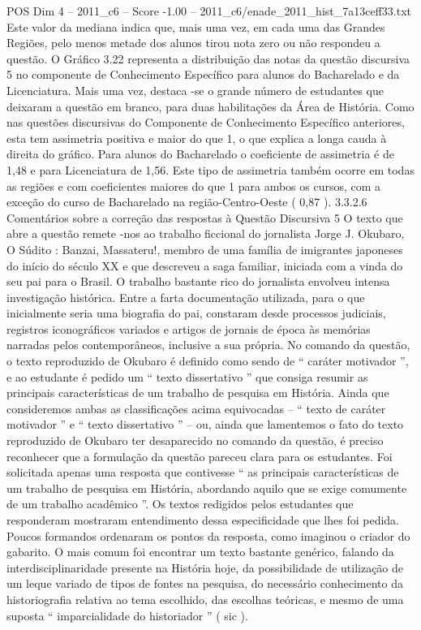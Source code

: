 \begin{textsample}{POS Dim 4 – 2011\_c6 – Score -1.00 – 2011\_c6/enade\_2011\_hist\_7a13ceff33.txt}
Este valor da mediana indica que, mais uma vez, em cada uma das Grandes Regiões, pelo menos metade dos alunos tirou nota zero ou não respondeu a questão.
O Gráfico 3.22 representa a distribuição das notas da questão discursiva 5 no componente de Conhecimento Específico para alunos do Bacharelado e da Licenciatura.
Mais uma vez, destaca -se o grande número de estudantes que deixaram a questão em branco, para duas habilitações da Área de História.
Como nas questões discursivas do Componente de Conhecimento Específico anteriores, esta tem assimetria positiva e maior do que 1, o que explica a longa cauda à direita do gráfico.
Para alunos do Bacharelado o coeficiente de assimetria é de 1,48 e para Licenciatura de 1,56.
Este tipo de assimetria também ocorre em todas as regiões e com coeficientes maiores do que 1 para ambos os cursos, com a exceção do curso de Bacharelado na região-Centro-Oeste ( 0,87 ). 3.3.2.6 Comentários sobre a correção das respostas à Questão Discursiva 5 O texto que abre a questão remete -nos ao trabalho ficcional do jornalista Jorge J.
Okubaro, O Súdito : Banzai, Massateru!, membro de uma família de imigrantes japoneses do início do século XX e que descreveu a saga familiar, iniciada com a vinda do seu pai para o Brasil.
O trabalho bastante rico do jornalista envolveu intensa investigação histórica.
Entre a farta documentação utilizada, para o que inicialmente seria uma biografia do pai, constaram desde processos judiciais, registros iconográficos variados e artigos de jornais de época às memórias narradas pelos contemporâneos, inclusive a sua própria.
No comando da questão, o texto reproduzido de Okubaro é definido como sendo de “ caráter motivador ”, e ao estudante é pedido um “ texto dissertativo ” que consiga resumir as principais características de um trabalho de pesquisa em História.
Ainda que consideremos ambas as classificações acima equivocadas – “ texto de caráter motivador ” e “ texto dissertativo ” – ou, ainda que lamentemos o fato do texto reproduzido de Okubaro ter desaparecido no comando da questão, é preciso reconhecer que a formulação da questão pareceu clara para os estudantes.
Foi solicitada apenas uma resposta que contivesse “ as principais características de um trabalho de pesquisa em História, abordando aquilo que se exige comumente de um trabalho acadêmico ”.
Os textos redigidos pelos estudantes que responderam mostraram entendimento dessa especificidade que lhes foi pedida.
Poucos formandos ordenaram os pontos da resposta, como imaginou o criador do gabarito.
O mais comum foi encontrar um texto bastante genérico, falando da interdisciplinaridade presente na História hoje, da possibilidade de utilização de um leque variado de tipos de fontes na pesquisa, do necessário conhecimento da historiografia relativa ao tema escolhido, das escolhas teóricas, e mesmo de uma suposta “ imparcialidade do historiador ” ( sic ).

\end{textsample}
